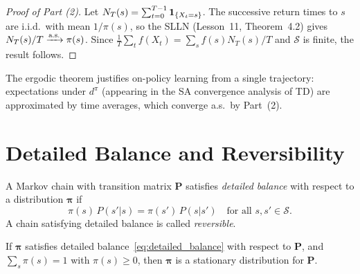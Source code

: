 \documentclass[11pt,a4paper]{article}
\begin{document}
\begin{proof}[Proof of Part (2)]
Let $N_T(s) = \sum_{t=0}^{T-1} \mathbf{1}_{\{X_t = s\}}$.
The successive return times to $s$ are i.i.d.\ with mean
$1/\pi(s)$, so the SLLN (Lesson~11, Theorem~4.2) gives
$N_T(s)/T \xrightarrow{\text{a.s.}} \pi(s)$.
Since $\frac{1}{T}\sum_t f(X_t) = \sum_s f(s) N_T(s)/T$ and
$\mathcal{S}$ is finite, the result follows.
\end{proof}

\begin{rlconnection}[title={Ergodic Theorem and On-Policy Learning}]
The ergodic theorem justifies on-policy learning from a single
trajectory: expectations under $d^\pi$ (appearing in the SA
convergence analysis of TD) are approximated by time averages,
which converge a.s.\ by Part~(2).
\end{rlconnection}


\section{Detailed Balance and Reversibility}
\label{sec:detailed_balance}

\begin{definition}
\label{def:detailed_balance}
A Markov chain with transition matrix $\mathbf{P}$ satisfies
\emph{detailed balance} with respect to a distribution
$\boldsymbol{\pi}$ if
\begin{equation}
  \pi(s)\, P(s'|s) = \pi(s')\, P(s|s')
  \quad \text{for all } s, s' \in \mathcal{S}.
  \label{eq:detailed_balance}
\end{equation}
A chain satisfying detailed balance is called \emph{reversible}.
\end{definition}

\begin{keyresult}[title={Detailed Balance Implies Stationarity}]
\begin{proposition}
\label{prop:db_stationary}
If $\boldsymbol{\pi}$ satisfies detailed
balance~\eqref{eq:detailed_balance} with respect to $\mathbf{P}$,
and $\sum_s \pi(s) = 1$ with $\pi(s) \geq 0$, then
$\boldsymbol{\pi}$ is a stationary distribution for $\mathbf{P}$.
\end{proposition}
\end{keyresult}
\end{document}
